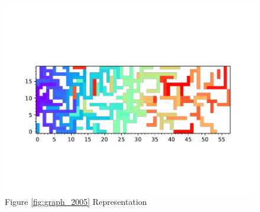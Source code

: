 \documentclass{standalone}
\begin{document}
\begin{figure}[!htb]
	\caption{Figure \ref{fig:graph_2005} Representation}
	\label{fig:picture_2005}
	\includegraphics[width=\textwidth]{../graphs/picture/2005.pdf}
\end{figure}
\end{document}

